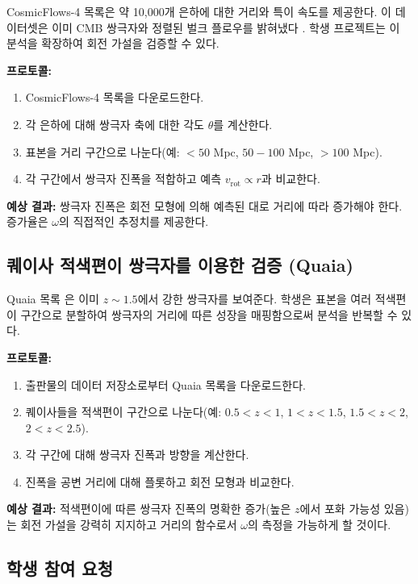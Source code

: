 \documentclass[11pt,a4paper]{article}
\begin{document}
	CosmicFlows-4 목록은 약 10,000개 은하에 대한 거리와 특이 속도를 제공한다. 이 데이터셋은 이미 CMB 쌍극자와 정렬된 벌크 플로우를 밝혀냈다 \cite{Watkins2023}. 학생 프로젝트는 이 분석을 확장하여 회전 가설을 검증할 수 있다.
	
	\textbf{프로토콜:}
	\begin{enumerate}
		\item CosmicFlows-4 목록을 다운로드한다.
		\item 각 은하에 대해 쌍극자 축에 대한 각도 \(\theta\)를 계산한다.
		\item 표본을 거리 구간으로 나눈다(예: \(<50\) Mpc, \(50-100\) Mpc, \(>100\) Mpc).
		\item 각 구간에서 쌍극자 진폭을 적합하고 예측 \(v_{\mathrm{rot}} \propto r\)과 비교한다.
	\end{enumerate}
	
	\textbf{예상 결과:} 쌍극자 진폭은 회전 모형에 의해 예측된 대로 거리에 따라 증가해야 한다. 증가율은 \(\omega\)의 직접적인 추정치를 제공한다.
	
	\subsection{퀘이사 적색편이 쌍극자를 이용한 검증 (Quaia)}
	
	Quaia 목록 \cite{Secrest2025}은 이미 \(z\sim1.5\)에서 강한 쌍극자를 보여준다. 학생은 표본을 여러 적색편이 구간으로 분할하여 쌍극자의 거리에 따른 성장을 매핑함으로써 분석을 반복할 수 있다.
	
	\textbf{프로토콜:}
	\begin{enumerate}
		\item 출판물의 데이터 저장소로부터 Quaia 목록을 다운로드한다.
		\item 퀘이사들을 적색편이 구간으로 나눈다(예: \(0.5<z<1\), \(1<z<1.5\), \(1.5<z<2\), \(2<z<2.5\)).
		\item 각 구간에 대해 쌍극자 진폭과 방향을 계산한다.
		\item 진폭을 공변 거리에 대해 플롯하고 회전 모형과 비교한다.
	\end{enumerate}
	
	\textbf{예상 결과:} 적색편이에 따른 쌍극자 진폭의 명확한 증가(높은 \(z\)에서 포화 가능성 있음)는 회전 가설을 강력히 지지하고 거리의 함수로서 \(\omega\)의 측정을 가능하게 할 것이다.
	
	\subsection{학생 참여 요청}
	
\end{document}
